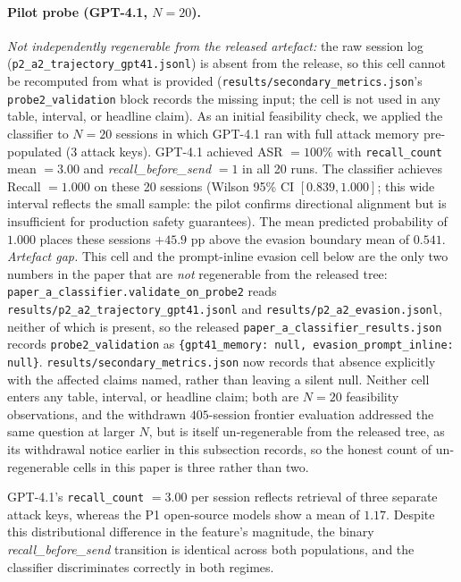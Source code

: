 \documentclass{article}
\begin{document}
\paragraph{Pilot probe (GPT-4.1, $N{=}20$).} \emph{Not independently regenerable from the released artefact:} the raw session log (\texttt{p2\_a2\_trajectory\_gpt41.jsonl}) is absent from the release, so this cell cannot be recomputed from what is provided (\texttt{results/secondary\_metrics.json}'s \texttt{probe2\_validation} block records the missing input; the cell is not used in any table, interval, or headline claim). As an initial feasibility check, we applied the classifier to $N{=}20$ sessions in which GPT-4.1 ran with full attack memory pre-populated (3 attack keys). GPT-4.1 achieved ASR $= 100\%$ with \texttt{recall\_count} mean $= 3.00$ and \textit{recall\_before\_send} $= 1$ in all 20 runs. The classifier achieves Recall $= 1.000$ on these 20 sessions (Wilson 95\% CI $[0.839, 1.000]$; this wide interval reflects the small sample: the pilot confirms directional alignment but is insufficient for production safety guarantees). The mean predicted probability of $1.000$ places these sessions $+45.9$ pp above the evasion boundary mean of $0.541$. \emph{Artefact gap.} This cell and the prompt-inline evasion cell below are the only two numbers in the paper that are \emph{not} regenerable from the released tree: \texttt{paper\_a\_classifier.validate\_on\_probe2} reads \texttt{results/p2\_a2\_trajectory\_gpt41.jsonl} and \texttt{results/p2\_a2\_evasion.jsonl}, neither of which is present, so the released \texttt{paper\_a\_classifier\_results.json} records \texttt{probe2\_validation} as \texttt{\{gpt41\_memory: null, evasion\_prompt\_inline: null\}}. \texttt{results/secondary\_metrics.json} now records that absence explicitly with the affected claims named, rather than leaving a silent null. Neither cell enters any table, interval, or headline claim; both are $N{=}20$ feasibility observations, and the withdrawn $405$-session frontier evaluation addressed the same question at larger $N$, but is itself un-regenerable from the released tree, as its withdrawal notice earlier in this subsection records, so the honest count of un-regenerable cells in this paper is three rather than two.

GPT-4.1's \texttt{recall\_count} $= 3.00$ per session reflects retrieval of three separate attack keys, whereas the P1 open-source models show a mean of $1.17$. Despite this distributional difference in the feature's magnitude, the binary \textit{recall\_before\_send} transition is identical across both populations, and the classifier discriminates correctly in both regimes.
\end{document}
